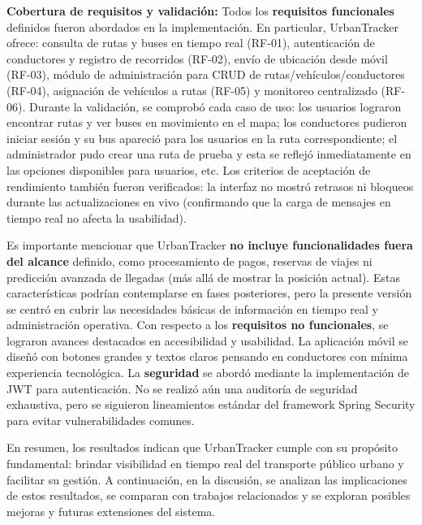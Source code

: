 \textbf{Cobertura de requisitos y validación:} Todos los \textbf{requisitos funcionales} definidos fueron abordados en la implementación. En particular, UrbanTracker ofrece: consulta de rutas y buses en tiempo real (RF-01), autenticación de conductores y registro de recorridos (RF-02), envío de ubicación desde móvil (RF-03), módulo de administración para CRUD de rutas/vehículos/conductores (RF-04), asignación de vehículos a rutas (RF-05) y monitoreo centralizado (RF-06). Durante la validación, se comprobó cada caso de uso: los usuarios lograron encontrar rutas y ver buses en movimiento en el mapa; los conductores pudieron iniciar sesión y su bus apareció para los usuarios en la ruta correspondiente; el administrador pudo crear una ruta de prueba y esta se reflejó inmediatamente en las opciones disponibles para usuarios, etc. Los criterios de aceptación de rendimiento también fueron verificados: la interfaz no mostró retrasos ni bloqueos durante las actualizaciones en vivo (confirmando que la carga de mensajes en tiempo real no afecta la usabilidad).

Es importante mencionar que UrbanTracker \textbf{no incluye funcionalidades fuera del alcance} definido, como procesamiento de pagos, reservas de viajes ni predicción avanzada de llegadas (más allá de mostrar la posición actual). Estas características podrían contemplarse en fases posteriores, pero la presente versión se centró en cubrir las necesidades básicas de información en tiempo real y administración operativa. Con respecto a los \textbf{requisitos no funcionales}, se lograron avances destacados en accesibilidad y usabilidad. La aplicación móvil se diseñó con botones grandes y textos claros pensando en conductores con mínima experiencia tecnológica. La \textbf{seguridad} se abordó mediante la implementación de JWT para autenticación. No se realizó aún una auditoría de seguridad exhaustiva, pero se siguieron lineamientos estándar del framework Spring Security para evitar vulnerabilidades comunes.

En resumen, los resultados indican que UrbanTracker cumple con su propósito fundamental: brindar visibilidad en tiempo real del transporte público urbano y facilitar su gestión. A continuación, en la discusión, se analizan las implicaciones de estos resultados, se comparan con trabajos relacionados y se exploran posibles mejoras y futuras extensiones del sistema.
